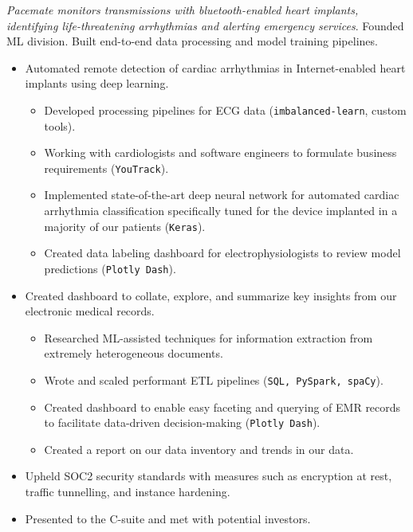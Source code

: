 \documentclass[a4paper,12pt]{article}
\begin{document}
    \vspace{-6pt} \textit{Pacemate monitors transmissions with bluetooth-enabled heart implants, identifying life-threatening arrhythmias and alerting emergency services}. Founded ML division. Built end-to-end data processing and model training pipelines.

    \begin{itemize}

        \item  Automated remote detection of cardiac arrhythmias in Internet-enabled heart implants using deep learning.
        \begin{itemize}
            \item Developed processing pipelines for ECG data (\texttt{imbalanced-learn}, custom tools).
            \item Working with cardiologists and software engineers to formulate business requirements (\texttt{YouTrack}).
            \item Implemented state-of-the-art deep neural network for automated cardiac arrhythmia classification specifically tuned for the device implanted in a majority of our patients (\texttt{Keras}).
            \item Created data labeling dashboard for electrophysiologists to review model predictions (\texttt{Plotly Dash}).
        \end{itemize}

        \item Created dashboard to collate, explore, and summarize key insights from our electronic medical records.
        \begin{itemize}
            \item Researched ML-assisted techniques for information extraction from extremely heterogeneous documents.
            \item Wrote and scaled performant ETL pipelines (\texttt{SQL, PySpark, spaCy}).
            \item Created dashboard to enable easy faceting and querying of EMR records to facilitate data-driven decision-making (\texttt{Plotly Dash}).
            \item Created a report on our data inventory and trends in our data.
        \end{itemize}


        \item Upheld SOC2 security standards with measures such as encryption at rest, traffic tunnelling, and instance hardening.
        \item Presented to the C-suite and met with potential investors.

    \end{itemize}
\end{document}
